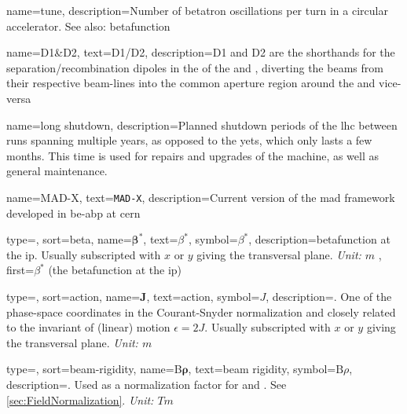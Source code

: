 {
        name=tune,
        description={Number of betatron oscillations per turn in a circular accelerator.
        See also: \gls{betafunction}%
        }
}

{
        name={D1\&D2},
        text={D1/D2},
        description={D1 and D2 are the shorthands for the separation/recombination dipoles in the 
         of the  and , diverting the \glspl{beam} from their respective
        beam-lines into the common aperture region around the  and 
        vice-versa%
        }
}

{
        name={long shutdown},
        description={Planned shutdown periods of the \acrfull{lhc} between \glspl{run} spanning multiple years,
        as opposed to the \acrfull{yets}, which only lasts a few months.
        This time is used for repairs and upgrades of the machine, as well as general maintenance.
        }
}

{
        name={MAD-X},
        text={\texttt{MAD-X}},
        description={Current version of the \acrfull{mad} framework developed in \acrshort{be}-\acrshort{abp}
        at \acrshort{cern}%
        }
}



{
    type=\symboltype,
    sort={beta},
    name={$\bm \beta^*$},
    text={\ensuremath{\beta^*}},
    symbol={\ensuremath{\beta^*}},
    description={\gls{betafunction} at the \acrshort{ip}. 
    Usually subscripted with $x$ or $y$ giving the transversal plane.
    \textit{Unit: $m$}%
    },
    first={$\beta^*$ (the \gls{betafunction} at the \acrshort{ip})}
}

{
    type=\symboltype,
    sort={action},
    name={$\bm J$},
    text={action},
    symbol={\ensuremath{J}},
    description={.
    One of the phase-space coordinates in the Courant-Snyder normalization
    and closely related to the invariant of (linear) motion $\epsilon = 2J$. 
    Usually subscripted with $x$ or $y$ giving the transversal plane.
    \textit{Unit: $m$}%
    }
}

{
    type=\symboltype,
    sort={beam-rigidity},
    name={B$\bm \rho$},
    text={beam rigidity},
    symbol={\ensuremath{\mathrm{B}\rho}},
    description={.
    Used as a normalization factor for  and . 
    See \cref{sec:FieldNormalization}.
    \textit{Unit: $Tm$}%
    }
}

